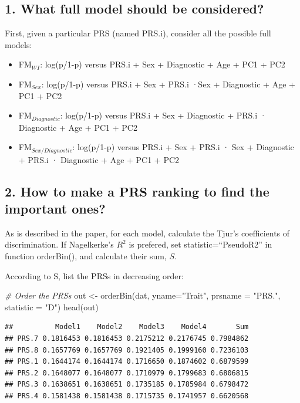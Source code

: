 \documentclass[
]{article}
\newenvironment{Shaded}{\begin{snugshade}}{\end{snugshade}}
\newcommand{\AttributeTok}[1]{\textcolor[rgb]{0.77,0.63,0.00}{#1}}
\newcommand{\CommentTok}[1]{\textcolor[rgb]{0.56,0.35,0.01}{\textit{#1}}}
\newcommand{\FunctionTok}[1]{\textcolor[rgb]{0.00,0.00,0.00}{#1}}
\newcommand{\NormalTok}[1]{#1}
\newcommand{\OtherTok}[1]{\textcolor[rgb]{0.56,0.35,0.01}{#1}}
\newcommand{\StringTok}[1]{\textcolor[rgb]{0.31,0.60,0.02}{#1}}
\providecommand{\tightlist}{%
  \setlength{\itemsep}{0pt}\setlength{\parskip}{0pt}}
\begin{document}
\hypertarget{what-full-model-should-be-considered}{%
\subsection{1. What full model should be
considered?}\label{what-full-model-should-be-considered}}

First, given a particular PRS (named PRS.i), consider all the possible
full models:

\begin{itemize}
\tightlist
\item
  FM\(_{WI}\): log(p/1-p) versus PRS.i + Sex + Diagnostic + Age + PC1 +
  PC2
\item
  FM\(_{Sex}\): log(p/1-p) versus PRS.i + Sex + PRS.i ·Sex + Diagnostic
  + Age + PC1 + PC2
\item
  FM\(_{Diagnostic}\): log(p/1-p) versus PRS.i + Sex + Diagnostic +
  PRS.i · Diagnostic + Age + PC1 + PC2
\item
  FM\(_{Sex/Diagnostic}\): log(p/1-p) versus PRS.i + Sex + PRS.i · Sex +
  Diagnostic + PRS.i · Diagnostic + Age + PC1 + PC2
\end{itemize}

\hypertarget{how-to-make-a-prs-ranking-to-find-the-important-ones}{%
\subsection{2. How to make a PRS ranking to find the important
ones?}\label{how-to-make-a-prs-ranking-to-find-the-important-ones}}

As is described in the paper, for each model, calculate the Tjur's
coefficients of discrimination. If Nagelkerke's \(R^2\) is prefered, set
statistic=``PseudoR2'' in function orderBin(), and calculate their sum,
\(S\).

According to S, list the PRSs in decreasing order:

\begin{Shaded}
\begin{Highlighting}[]
\CommentTok{\# Order the PRSs}
\NormalTok{out }\OtherTok{\textless{}{-}} \FunctionTok{orderBin}\NormalTok{(dat, }\AttributeTok{yname=}\StringTok{"Trait"}\NormalTok{, }\AttributeTok{prsname =} \StringTok{"PRS."}\NormalTok{, }\AttributeTok{statistic =} \StringTok{"D"}\NormalTok{)}
\FunctionTok{head}\NormalTok{(out)}
\end{Highlighting}
\end{Shaded}

\begin{verbatim}
##          Model1    Model2    Model3    Model4       Sum
## PRS.7 0.1816453 0.1816453 0.2175212 0.2176745 0.7984862
## PRS.8 0.1657769 0.1657769 0.1921405 0.1999160 0.7236103
## PRS.1 0.1644174 0.1644174 0.1716650 0.1874602 0.6879599
## PRS.2 0.1648077 0.1648077 0.1710979 0.1799683 0.6806815
## PRS.3 0.1638651 0.1638651 0.1735185 0.1785984 0.6798472
## PRS.4 0.1581438 0.1581438 0.1715735 0.1741957 0.6620568
\end{verbatim}
\end{document}
